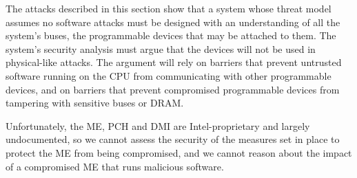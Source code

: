 
The attacks described in this section show that a system whose threat model
assumes no software attacks must be designed with an understanding of all the
system's buses, the programmable devices that may be attached to them. The
system's security analysis must argue that the devices will not be used in
physical-like attacks. The argument will rely on barriers that prevent
untrusted software running on the CPU from communicating with other
programmable devices, and on barriers that prevent compromised programmable
devices from tampering with sensitive buses or DRAM.

Unfortunately, the ME, PCH and DMI are Intel-proprietary and largely
undocumented, so we cannot assess the security of the measures set in place to
protect the ME from being compromised, and we cannot reason about the impact
of a compromised ME that runs malicious software.
